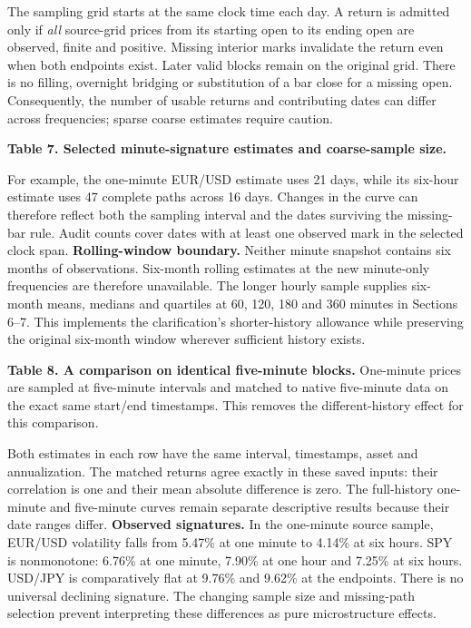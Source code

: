 The sampling grid starts at the same clock time each day. A return is admitted only if \emph{all} source-grid prices from its starting open to its ending open are observed, finite and positive. Missing interior marks invalidate the return even when both endpoints exist. Later valid blocks remain on the original grid. There is no filling, overnight bridging or substitution of a bar close for a missing open. Consequently, the number of usable returns and contributing dates can differ across frequencies; sparse coarse estimates require caution.

\textbf{Table 7. Selected minute-signature estimates and coarse-sample size.}
\begin{center}\footnotesize\end{center}
For example, the one-minute EUR/USD estimate uses 21 days, while its six-hour estimate uses 47 complete paths across 16 days. Changes in the curve can therefore reflect both the sampling interval and the dates surviving the missing-bar rule. Audit counts cover dates with at least one observed mark in the selected clock span.
\textbf{Rolling-window boundary.} Neither minute snapshot contains six months of observations. Six-month rolling estimates at the new minute-only frequencies are therefore unavailable. The longer hourly sample supplies six-month means, medians and quartiles at 60, 120, 180 and 360 minutes in Sections 6--7. This implements the clarification's shorter-history allowance while preserving the original six-month window wherever sufficient history exists.

\clearpage
{}
\textbf{Table 8. A comparison on identical five-minute blocks.} One-minute prices are sampled at five-minute intervals and matched to native five-minute data on the exact same start/end timestamps. This removes the different-history effect for this comparison.
\begin{center}\footnotesize\end{center}
Both estimates in each row have the same interval, timestamps, asset and annualization. The matched returns agree exactly in these saved inputs: their correlation is one and their mean absolute difference is zero. The full-history one-minute and five-minute curves remain separate descriptive results because their date ranges differ.
\textbf{Observed signatures.} In the one-minute source sample, EUR/USD volatility falls from 5.47\% at one minute to 4.14\% at six hours. SPY is nonmonotone: 6.76\% at one minute, 7.90\% at one hour and 7.25\% at six hours. USD/JPY is comparatively flat at 9.76\% and 9.62\% at the endpoints. There is no universal declining signature. The changing sample size and missing-path selection prevent interpreting these differences as pure microstructure effects.

